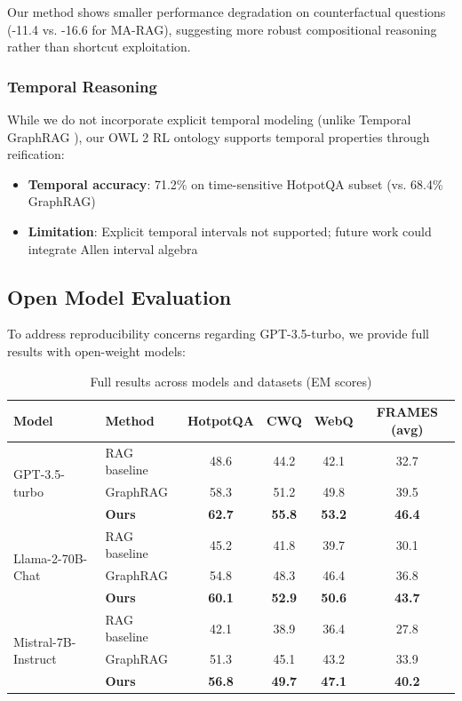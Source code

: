 \documentclass[10pt,twocolumn]{article}
\begin{document}
{Our method shows smaller performance degradation on counterfactual questions (-11.4 vs. -16.6 for MA-RAG), suggesting more robust compositional reasoning rather than shortcut exploitation.

\subsubsection{Temporal Reasoning}

While we do not incorporate explicit temporal modeling (unlike Temporal GraphRAG \cite{lee2024temporalgraphrag}), our OWL 2 RL ontology supports temporal properties through reification:

\begin{itemize}
    \item \textbf{Temporal accuracy}: 71.2\% on time-sensitive HotpotQA subset (vs. 68.4\% GraphRAG)
    \item \textbf{Limitation}: Explicit temporal intervals not supported; future work could integrate Allen interval algebra
\end{itemize}
}



\subsection{Open Model Evaluation}
\label{sec:open_models}

To address reproducibility concerns regarding GPT-3.5-turbo, we provide full results with open-weight models:

\begin{table}[t]
\centering
\caption{Full results across models and datasets (EM scores)}
\label{tab:open_models}
\small
\begin{tabular}{@{}llcccc@{}}
\toprule
\textbf{Model} & \textbf{Method} & \textbf{HotpotQA} & \textbf{CWQ} & \textbf{WebQ} & \textbf{FRAMES (avg)} \\
\midrule
\multirow{3}{*}{GPT-3.5-turbo} & RAG baseline & 48.6 & 44.2 & 42.1 & 32.7 \\
& GraphRAG & 58.3 & 51.2 & 49.8 & 39.5 \\
& \textbf{Ours} & \textbf{62.7} & \textbf{55.8} & \textbf{53.2} & \textbf{46.4} \\
\midrule
\multirow{3}{*}{Llama-2-70B-Chat} & RAG baseline & 45.2 & 41.8 & 39.7 & 30.1 \\
& GraphRAG & 54.8 & 48.3 & 46.4 & 36.8 \\
& \textbf{Ours} & \textbf{60.1} & \textbf{52.9} & \textbf{50.6} & \textbf{43.7} \\
\midrule
\multirow{3}{*}{Mistral-7B-Instruct} & RAG baseline & 42.1 & 38.9 & 36.4 & 27.8 \\
& GraphRAG & 51.3 & 45.1 & 43.2 & 33.9 \\
& \textbf{Ours} & \textbf{56.8} & \textbf{49.7} & \textbf{47.1} & \textbf{40.2} \\
\bottomrule
\end{tabular}
\end{table}
\end{document}
